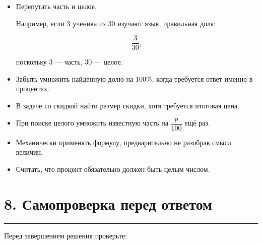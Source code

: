 \documentclass[a4paper,12pt]{article}
\newcommand{\sectionrule}{%
  \par
  \vspace{-0.35em}
  {\color{accent}\rule{\linewidth}{0.7pt}}
  \vspace{0.55em}
}
\begin{document}
\begin{itemize}

  \item
  Перепутать часть и целое.

  Например, если $3$ ученика из $30$ изучают язык,
  правильная доля:

  \[
  \frac{3}{30},
  \]

  поскольку $3$ --- часть, $30$ --- целое.

  \item
  Забыть умножить найденную долю на $100\%$,
  когда требуется ответ именно в процентах.

  \item
  В задаче со скидкой найти размер скидки,
  хотя требуется итоговая цена.

  \item
  При поиске целого умножить известную часть на
  $\dfrac{p}{100}$ ещё раз.

  \item
  Механически применять формулу,
  предварительно не разобрав смысл величин.

  \item
  Считать, что процент обязательно должен быть целым числом.

\end{itemize}


\section*{8. Самопроверка перед ответом}
\sectionrule

Перед завершением решения проверьте:
\end{document}
